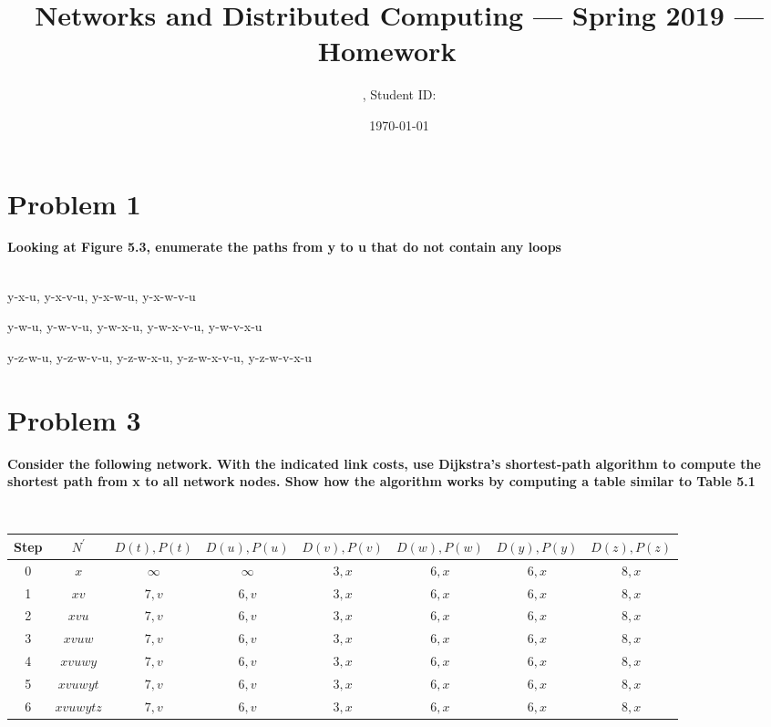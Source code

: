 \documentclass[11pt]{article}
\title{\Large Networks and Distributed Computing --- Spring 2019 --- Homework \Homework\ }
\author{\Name, Student ID: \SID}
\date{\today}
\begin{document}
\maketitle

\section{Problem 1}

\textbf{Looking at Figure 5.3, enumerate the paths from y to u that do not contain any loops}

~\\

y-x-u, y-x-v-u, y-x-w-u, y-x-w-v-u

y-w-u, y-w-v-u, y-w-x-u, y-w-x-v-u, y-w-v-x-u

y-z-w-u, y-z-w-v-u, y-z-w-x-u, y-z-w-x-v-u, y-z-w-v-x-u


\newpage
\section{Problem 3}

\textbf{Consider the following network. With the indicated link costs, use Dijkstra’s shortest-path algorithm to compute the shortest path from x to all network nodes. Show how the algorithm works by computing a table similar to Table 5.1}

~\\

\begin{tabular}{c|c|c|c|c|c|c|c}
	Step & $N^\prime$ & $D(t),P(t)$ & $D(u),P(u)$ & $D(v),P(v)$ & $D(w),P(w)$ & $D(y),P(y)$ & $D(z),P(z)$ \\
	\hline
	0 & $x$              & $\infty$ & $\infty$ & $3, x$ & $6, x$ & $6, x$ & $8, x$ \\
	1 & $xv$            & $7, v$ & $6,v$ & $3, x$ & $6, x$ & $6, x$ & $8, x$ \\
	2 & $xvu$           & $7, v$ & $6,v$ & $3, x$ & $6, x$ & $6, x$ & $8, x$ \\
	3 & $xvuw$        & $7, v$ & $6,v$ & $3, x$ & $6, x$ & $6, x$ & $8, x$ \\
	4 & $xvuwy$      & $7, v$ & $6,v$ & $3, x$ & $6, x$ & $6, x$ & $8, x$ \\
	5 & $xvuwyt$     & $7, v$ & $6,v$ & $3, x$ & $6, x$ & $6, x$ & $8, x$ \\
	6 & $xvuwytz$   & $7, v$ & $6,v$ & $3, x$ & $6, x$ & $6, x$ & $8, x$ \\
\end{tabular}
\end{document}
